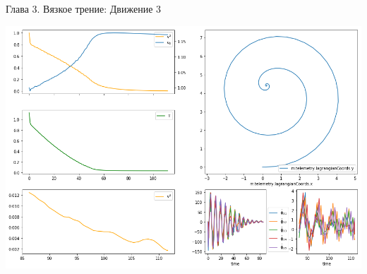 
\begin{frame}{Глава 3. Вязкое трение: Движение 3}

    \centering
    \includegraphics[width=\linewidth]{content/pic/new/visc_3_100.png}

\end{frame}

